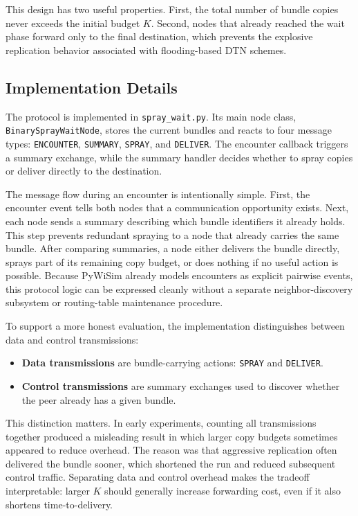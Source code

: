 This design has two useful properties. First, the total number of bundle copies never exceeds the initial budget $K$. Second, nodes that already reached the wait phase forward only to the final destination, which prevents the explosive replication behavior associated with flooding-based DTN schemes.

\subsection{Implementation Details}

The protocol is implemented in \texttt{spray\_wait.py}. Its main node class,
\texttt{BinarySpray\-Wait\-Node}, stores the current bundles and reacts to four
message types: \texttt{ENCOUNTER}, \texttt{SUMMARY}, \texttt{SPRAY}, and
\texttt{DELIVER}. The encounter callback triggers a summary exchange, while the
summary handler decides whether to spray copies or deliver directly to the
destination.

The message flow during an encounter is intentionally simple. First, the encounter event tells both nodes that a communication opportunity exists. Next, each node sends a summary describing which bundle identifiers it already holds. This step prevents redundant spraying to a node that already carries the same bundle. After comparing summaries, a node either delivers the bundle directly, sprays part of its remaining copy budget, or does nothing if no useful action is possible. Because PyWiSim already models encounters as explicit pairwise events, this protocol logic can be expressed cleanly without a separate neighbor-discovery subsystem or routing-table maintenance procedure.

To support a more honest evaluation, the implementation distinguishes between data and control transmissions:
\begin{itemize}
    \item \textbf{Data transmissions} are bundle-carrying actions: \texttt{SPRAY} and \texttt{DELIVER}.
    \item \textbf{Control transmissions} are summary exchanges used to discover whether the peer already has a given bundle.
\end{itemize}

This distinction matters. In early experiments, counting all transmissions together produced a misleading result in which larger copy budgets sometimes appeared to reduce overhead. The reason was that aggressive replication often delivered the bundle sooner, which shortened the run and reduced subsequent control traffic. Separating data and control overhead makes the tradeoff interpretable: larger $K$ should generally increase forwarding cost, even if it also shortens time-to-delivery.

